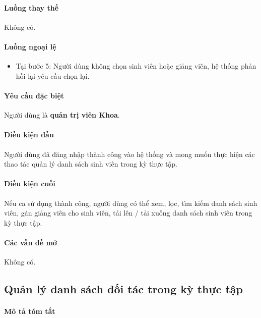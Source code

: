 \documentclass[./../main.tex]{subfiles}
\begin{document}
\paragraph*{Luồng thay thế} Không có.

\paragraph*{Luồng ngoại lệ}

\begin{itemize}
	\item

	      Tại bước 5: Người dùng không chọn sinh viên hoặc giảng viên, hệ thống phản hồi lại yêu cầu chọn lại.

\end{itemize}

\paragraph*{Yêu cầu đặc biệt}

Người dùng là \textbf{quản trị viên Khoa}.

\paragraph*{Điều kiện đầu}

Người dùng đã đăng nhập thành công vào hệ thống và mong muốn thực hiện các thao tác quản lý danh sách sinh viên trong kỳ thực tập.

\paragraph*{Điều kiện cuối}

Nếu ca sử dụng thành công, người dùng có thể xem, lọc, tìm kiếm danh sách sinh viên, gán giảng viên cho sinh viên, tải lên / tải xuống danh sách sinh viên trong kỳ thực tập.

\paragraph*{Các vấn đề mở}

Không có.

\subsection{Quản lý danh sách đối tác trong kỳ thực tập}

\paragraph*{Mô tả tóm tắt}
\end{document}
